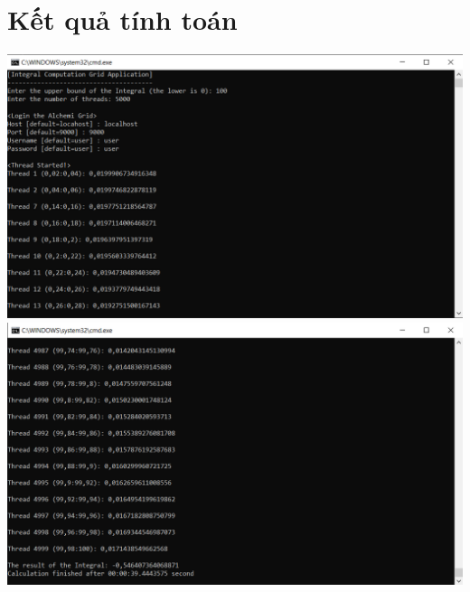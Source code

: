 \documentclass[12pt,a4paper]{report}
\begin{document}
\section{Kết quả tính toán}
\begin{center}
\includegraphics[scale=.6]{./Figures/IntegralCalculator/Result_01}
\includegraphics[scale=.6]{./Figures/IntegralCalculator/Result_02}
\end{center}
\clearpage
\end{document}

